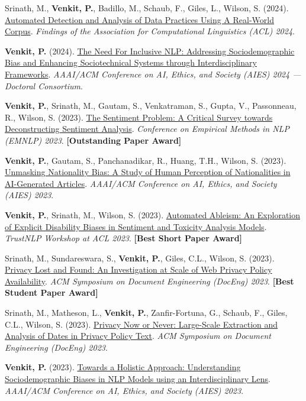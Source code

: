 {\begin{cvitems}
  \item {Srinath, M., \textbf{Venkit, P.}, Badillo, M., Schaub, F., Giles, L., Wilson, S. (2024). \href{https://aclanthology.org/2024.findings-acl.271/}{Automated Detection and Analysis of Data Practices Using A Real-World Corpus}. \textit{Findings of the Association for Computational Linguistics (ACL) 2024}.}
  \item {\textbf{Venkit, P.} (2024). \href{https://ojs.aaai.org/index.php/AIES/article/view/31905}{The Need For Inclusive NLP: Addressing Sociodemographic Bias and Enhancing Sociotechnical Systems through Interdisciplinary Frameworks}. \textit{AAAI/ACM Conference on AI, Ethics, and Society (AIES) 2024 --- Doctoral Consortium}.}
  \item {\textbf{Venkit, P.}, Srinath, M., Gautam, S., Venkatraman, S., Gupta, V., Passonneau, R., Wilson, S. (2023). \href{https://aclanthology.org/2023.emnlp-main.848/}{The Sentiment Problem: A Critical Survey towards Deconstructing Sentiment Analysis}. \textit{Conference on Empirical Methods in NLP (EMNLP) 2023}. \textbf{[Outstanding Paper Award]}}
  \item {\textbf{Venkit, P.}, Gautam, S., Panchanadikar, R., Huang, T.H., Wilson, S. (2023). \href{https://dl.acm.org/doi/10.1145/3600211.3604667}{Unmasking Nationality Bias: A Study of Human Perception of Nationalities in AI-Generated Articles}. \textit{AAAI/ACM Conference on AI, Ethics, and Society (AIES) 2023}.}
  \item {\textbf{Venkit, P.}, Srinath, M., Wilson, S. (2023). \href{https://aclanthology.org/2023.trustnlp-1.3/}{Automated Ableism: An Exploration of Explicit Disability Biases in Sentiment and Toxicity Analysis Models}. \textit{TrustNLP Workshop at ACL 2023}. \textbf{[Best Short Paper Award]}}
  \item {Srinath, M., Sundareswara, S., \textbf{Venkit, P.}, Giles, C.L., Wilson, S. (2023). \href{https://dl.acm.org/doi/abs/10.1145/3573128.3604902}{Privacy Lost and Found: An Investigation at Scale of Web Privacy Policy Availability}. \textit{ACM Symposium on Document Engineering (DocEng) 2023}. \textbf{[Best Student Paper Award]}}
  \item {Srinath, M., Matheson, L., \textbf{Venkit, P.}, Zanfir-Fortuna, G., Schaub, F., Giles, C.L., Wilson, S. (2023). \href{https://dl.acm.org/doi/abs/10.1145/3573128.3609342}{Privacy Now or Never: Large-Scale Extraction and Analysis of Dates in Privacy Policy Text}. \textit{ACM Symposium on Document Engineering (DocEng) 2023}.}
  \item {\textbf{Venkit, P.} (2023). \href{https://dl.acm.org/doi/10.1145/3600211.3604754}{Towards a Holistic Approach: Understanding Sociodemographic Biases in NLP Models using an Interdisciplinary Lens}. \textit{AAAI/ACM Conference on AI, Ethics, and Society (AIES) 2023}.}

\end{cvitems}}
